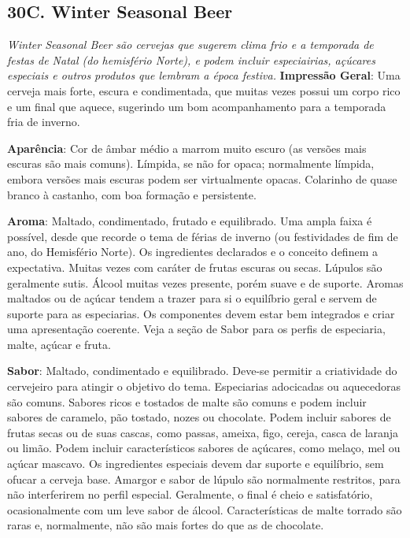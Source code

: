 \subsection*{30C. Winter Seasonal Beer}
\textit{Winter Seasonal Beer são cervejas que sugerem clima frio e a temporada de festas de Natal (do hemisfério Norte), e podem incluir especiairias, açúcares especiais e outros produtos que lembram a época festiva.}
\textbf{Impressão Geral}: Uma cerveja mais forte, escura e condimentada, que muitas vezes possui um corpo rico e um final que aquece, sugerindo um bom acompanhamento para a temporada fria de inverno.

\textbf{Aparência}: Cor de âmbar médio a marrom muito escuro (as versões mais escuras são mais comuns). Límpida, se não for opaca; normalmente límpida, embora versões mais escuras podem ser virtualmente opacas. Colarinho de quase branco à castanho, com boa formação e persistente.

\textbf{Aroma}: Maltado, condimentado, frutado e equilibrado. Uma ampla faixa é possível, desde que recorde o tema de férias de inverno (ou festividades de fim de ano, do Hemisfério Norte). Os ingredientes declarados e o conceito definem a expectativa. Muitas vezes com caráter de frutas escuras ou secas. Lúpulos são geralmente sutis. Álcool muitas vezes presente, porém suave e de suporte. Aromas maltados ou de açúcar tendem a trazer para si o equilíbrio geral e servem de suporte para as especiarias. Os componentes devem estar bem integrados e criar uma apresentação coerente. Veja a seção de Sabor para os perfis de especiaria, malte, açúcar e fruta.

\textbf{Sabor}: Maltado, condimentado e equilibrado. Deve-se permitir a criatividade do cervejeiro para atingir o objetivo do tema. Especiarias adocicadas ou aquecedoras são comuns. Sabores ricos e tostados de malte são comuns e podem incluir sabores de caramelo, pão tostado, nozes ou chocolate. Podem incluir sabores de frutas secas ou de suas cascas, como passas, ameixa, figo, cereja, casca de laranja ou limão. Podem incluir característicos sabores de açúcares, como melaço, mel ou açúcar mascavo. Os ingredientes especiais devem dar suporte e equilíbrio, sem ofucar a cerveja base. Amargor e sabor de lúpulo são normalmente restritos, para não interferirem no perfil especial. Geralmente, o final é cheio e satisfatório, ocasionalmente com um leve sabor de álcool. Características de malte torrado são raras e, normalmente, não são mais fortes do que as de chocolate.

